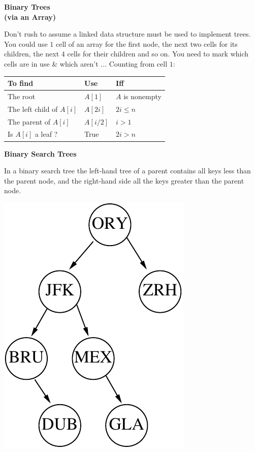 \documentclass[a4,portraitt]{slides}
\begin{document}
\newpage
{\samepage
\begin{center}
{\Large{\bf Binary Trees\\[1.75ex]{\small(via an Array)}}}
\end{center}
Don't rush to assume a linked data structure must be used to implement
trees. You could use $1$ cell of an array for the first node, the next
two cells for its children, the next $4$ cells for their children and
so on. You need to mark which cells are in use \& which aren't ...
Counting from cell $1$:

\begin{center}
\begin{tabular}{|l|l|l|}\hline
To find & Use & Iff\\ \hline
The root & $A[1]$ & $A$ is nonempty \\
The left child of $A[i]$ & $A[2i]$ & $2i \leq n$ \\
The parent of $A[i]$ & $A[i/2]$ & $i > 1$\\
Is $A[i]$ a leaf ? & True & $2i > n$\\ \hline
\end{tabular}
\end{center}
}



\newpage
{\samepage
\begin{center}
{\Large{\bf Binary Search Trees}}
\end{center}
In a binary search tree the left-hand tree of a parent contains all keys less than the parent node,
and the right-hand side all the keys greater than the parent node.
\begin{center}
\includegraphics{../Images/treeapt.pdf}
\end{center}
}
\end{document}
